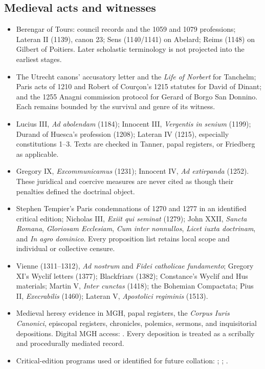 \subsection{Medieval acts and witnesses}

\begin{itemize}
  \item Berengar of Tours: council records and the 1059 and 1079 professions; Lateran II (1139), canon 23; Sens (1140/1141) on Abelard; Reims (1148) on Gilbert of Poitiers. Later scholastic terminology is not projected into the earliest stages.
  \item The Utrecht canons' accusatory letter and the \emph{Life of Norbert} for Tanchelm; Paris acts of 1210 and Robert of Cour\c{c}on's 1215 statutes for David of Dinant; and the 1255 Anagni commission protocol for Gerard of Borgo San Donnino. Each remains bounded by the survival and genre of its witness.
  \item Lucius III, \emph{Ad abolendam} (1184); Innocent III, \emph{Vergentis in senium} (1199); Durand of Huesca's profession (1208); Lateran IV (1215), especially constitutions 1--3. Texts are checked in Tanner, papal registers, or Friedberg as applicable.
  \item Gregory IX, \emph{Excommunicamus} (1231); Innocent IV, \emph{Ad extirpanda} (1252). These juridical and coercive measures are never cited as though their penalties defined the doctrinal object.
  \item Stephen Tempier's Paris condemnations of 1270 and 1277 in an identified critical edition; Nicholas III, \emph{Exiit qui seminat} (1279); John XXII, \emph{Sancta Romana}, \emph{Gloriosam Ecclesiam}, \emph{Cum inter nonnullos}, \emph{Licet iuxta doctrinam}, and \emph{In agro dominico}. Every proposition list retains local scope and individual or collective censure.
  \item Vienne (1311--1312), \emph{Ad nostrum} and \emph{Fidei catholicae fundamento}; Gregory XI's Wyclif letters (1377); Blackfriars (1382); Constance's Wyclif and Hus materials; Martin V, \emph{Inter cunctas} (1418); the Bohemian Compactata; Pius II, \emph{Execrabilis} (1460); Lateran V, \emph{Apostolici regiminis} (1513).
  \item Medieval heresy evidence in MGH, papal registers, the \emph{Corpus Iuris Canonici}, episcopal registers, chronicles, polemics, sermons, and inquisitorial depositions. Digital MGH access: . Every deposition is treated as a scribally and procedurally mediated record.
  \item Critical-edition programs used or identified for future collation: ; ; .
\end{itemize}

